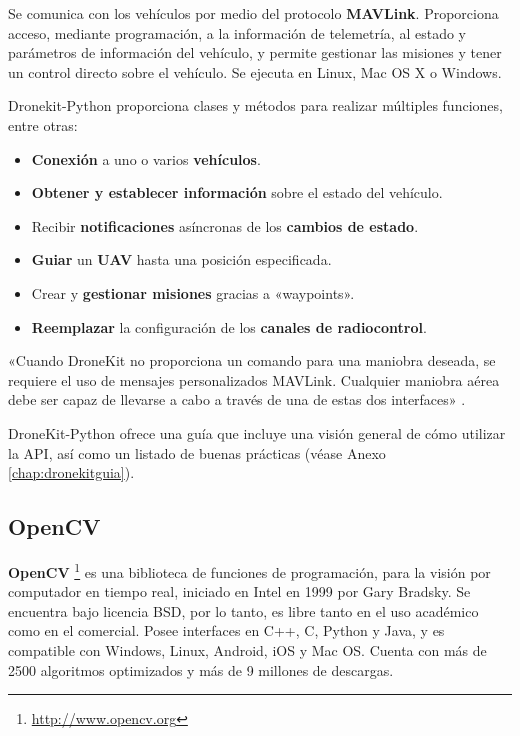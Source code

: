 Se comunica con los vehículos por medio del protocolo \textbf{MAVLink}. Proporciona acceso, mediante programación, a la información 
de telemetría, al estado y parámetros de información del vehículo, y permite gestionar las misiones y tener un control directo 
sobre el vehículo. Se ejecuta en Linux, Mac OS X o Windows. 

\clearpage

Dronekit-Python proporciona clases y métodos para realizar múltiples funciones, entre otras:
\begin{itemize}
\item \textbf{Conexión} a uno o varios \textbf{vehículos}.
\item \textbf{Obtener y establecer información} sobre el estado del vehículo.
\item Recibir \textbf{notificaciones} asíncronas de los \textbf{cambios de estado}.
\item \textbf{Guiar} un \textbf{\acs{UAV}} hasta una posición especificada.
\item Crear y \textbf{gestionar misiones} gracias a «waypoints».
\item \textbf{Reemplazar} la configuración de los \textbf{canales de radiocontrol}.
\end{itemize}

«Cuando DroneKit no proporciona un comando para una maniobra deseada, se requiere el uso de mensajes personalizados MAVLink.
Cualquier maniobra aérea debe ser capaz de llevarse a cabo a través de una de estas dos interfaces» \cite{dronekit}. 

DroneKit-Python ofrece una guía que incluye una visión general de cómo utilizar la \acs{API}, así como un listado de buenas prácticas (véase Anexo \ref{chap:dronekitguia}).

\subsection{OpenCV}
\label{sec:opencv}

\textbf{OpenCV} \footnote{\url{http://www.opencv.org}} es una biblioteca de funciones de programación, para la visión por computador 
en tiempo real, iniciado en Intel en 1999 por Gary Bradsky. Se encuentra bajo licencia BSD, por lo tanto, es libre tanto en el uso
académico como en el comercial. Posee interfaces en C++, C, Python y Java, y es compatible con Windows, Linux, Android, iOS y Mac OS.
Cuenta con más de 2500 algoritmos optimizados y más de 9 millones de descargas.

